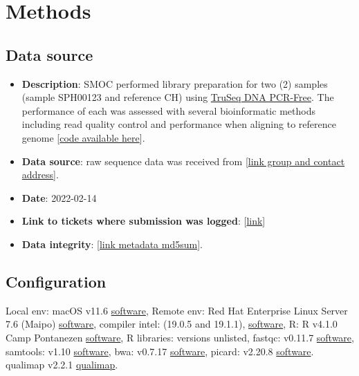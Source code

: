\documentclass{article}
\begin{document}
\section{Methods}
\subsection{Data source}
 \label{data_source}

\begin{itemize}
\item \textbf{Description}: SMOC performed library preparation for two (2) samples (sample SPH00123 and reference CH) using \href{https://www.sophiagenetics.com/clinical/oncology/solid-tumors/}{TruSeq DNA PCR-Free}.
The performance of each was assessed with several bioinformatic methods including read quality control and performance when aligning to reference genome
[\href{https://github.com/DylanLawless/kit_assess}{code available here}].
\item \textbf{Data source}: raw sequence data was received from
 [\href{https://www.sophiagenetics.com}{link group and contact address}].
\item \textbf{Date}: 2022-02-14
\item \textbf{Link to tickets where submission was logged}: [\href{https://www.sophiagenetics.com}{link}]
\item \textbf{Data integrity}: [\href{https://github.com/DylanLawless/kit_assess/blob/master/src/raw.md5sum}{link metadata md5sum}].
\end{itemize}

\subsection{Configuration}

Local env: macOS v11.6 \href{https://support.apple.com/macos}{software},
Remote env: Red Hat Enterprise Linux Server 7.6 (Maipo)  \href{https://www.redhat.com/en/technologies/linux-platforms/enterprise-linux}{software},
compiler intel: (19.0.5 and 19.1.1),
\href{https://www.intel.com/content/www/us/en/developer/tools/oneapi/commercial-base-hpc.html#gs.ppyt3x}{software},
R: R v4.1.0 Camp Pontanezen  \href{https://www.r-project.org}{software},
R libraries: versions unlisted,
fastqc: v0.11.7 \href{https://www.bioinformatics.babraham.ac.uk/projects/fastqc/}{software},
samtools: v1.10 \href{https://www.htslib.org}{software},
bwa: v0.7.17 \href{https://janis.readthedocs.io/en/latest/tools/bioinformatics/bwa/bwamem.html}{software},
picard: v2.20.8  \href{http://broadinstitute.github.io/picard/}{software}.
qualimap v2.2.1 \href{http://qualimap.conesalab.org}{qualimap}.
\end{document}
